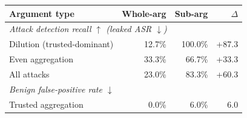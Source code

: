 \begin{tabular}{lrrr}
\toprule
\textbf{Argument type} & \textbf{Whole-arg} & \textbf{Sub-arg} & \textbf{$\Delta$} \\
\midrule
\multicolumn{4}{l}{\emph{Attack detection recall $\uparrow$ (leaked ASR $\downarrow$)}} \\
Dilution (trusted-dominant) & 12.7\% & 100.0\% & +87.3 \\
Even aggregation & 33.3\% & 66.7\% & +33.3 \\
All attacks & 23.0\% & 83.3\% & +60.3 \\
\midrule
\multicolumn{4}{l}{\emph{Benign false-positive rate $\downarrow$}} \\
Trusted aggregation & 0.0\% & 6.0\% & 6.0 \\
\bottomrule
\end{tabular}